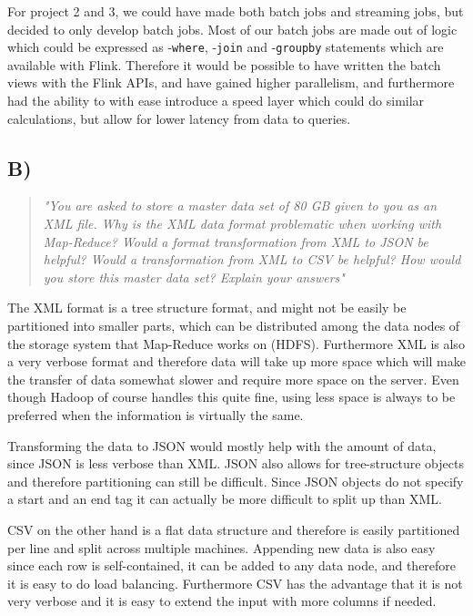 \newpar For project 2 and 3, we could have made both batch jobs and streaming jobs, but decided to only develop batch jobs. Most of our batch jobs are made out of logic which could be expressed as -\texttt{where}, -\texttt{join} and -\texttt{groupby} statements which are available with Flink. Therefore it would be possible to have written the batch views with the Flink APIs, and have gained higher parallelism, and furthermore had the ability to with ease introduce a speed layer which could do similar calculations, but allow for lower latency from data to queries.

\subsection{B)}
\begin{quote}
		\textit{"You	are	asked	to	store	a	master	data	set	of	80	GB	given	to	you	as	an	XML	file.	Why	is	the	XML	data	format	problematic	when	working	with	Map-Reduce?	Would	a	format	transformation	from	XML	to	JSON	be	helpful?	Would	a	transformation	from	XML	to	CSV	be	helpful?	How	would	you	store	this	master	data	set?	Explain	your	answers"}
\end{quote}
The XML format is a tree structure format, and might not be easily be partitioned into smaller parts, which can be distributed among the data nodes of the storage system that Map-Reduce works on (HDFS). Furthermore XML is also a very verbose format and therefore data will take up more space which will make the transfer of data somewhat slower and require more space on the server. Even though Hadoop of course handles this quite fine, using less space is always to be preferred when the information is virtually the same. 

Transforming the data to JSON would mostly help with the amount of data, since JSON is less verbose than XML. JSON also allows for tree-structure objects and therefore partitioning can still be difficult. Since JSON objects do not specify a start and an end tag it can actually be more difficult to split up than XML. 

\newpar CSV on the other hand is a flat data structure and therefore is easily partitioned per line and split across multiple machines. Appending new data is also easy since each row is self-contained, it can be added to any data node, and therefore it is easy to do load balancing. Furthermore CSV has the advantage that it is not very verbose and it is easy to extend the input with more columns if needed.

